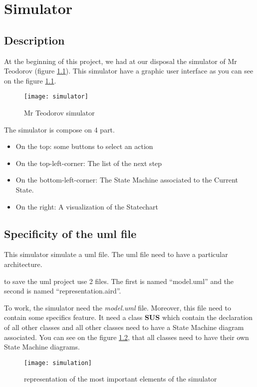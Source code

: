 
\chapter{Simulator}

\section{Description}


At the beginning of this project, we had at our disposal the simulator of Mr Teodorov (figure \ref{fig:sim}). This simulator have a graphic user interface as you can see on the figure \ref{fig:sim}.


\begin{figure}[h]
  \centering
  \texttt{[image: simulator]}
  \caption{Mr Teodorov simulator}
  \label{fig:sim}
\end{figure}


The simulator is compose on 4 part.
\begin{itemize}
\item On the top: some buttons to select an action
\item On the top-left-corner: The list of the next step
\item On the bottom-left-corner: The State Machine associated to the Current State.
\item On the right: A visualization of the Statechart
\end{itemize}

\section{Specificity of the uml file}

This simulator simulate a uml file. The uml file need to have a particular architecture.

\umld to save the uml project use 2 files. The first is named ``model.uml'' and the second is named ``representation.aird''.

To work, the simulator need the \textit{model.uml} file. Moreover, this file need to contain some specifics feature. It need a class \textbf{SUS} which contain the declaration of all other classes and all other classes need to have a State Machine diagram associated. You can see on the figure \ref{fig:simulateur}, that all classes need to have their own State Machine diagrams.

\begin{figure}[h!]
  \centering
  \texttt{[image: simulation]}
  \caption{representation of the most important elements of the simulator}
  \label{fig:simulateur}
\end{figure}




